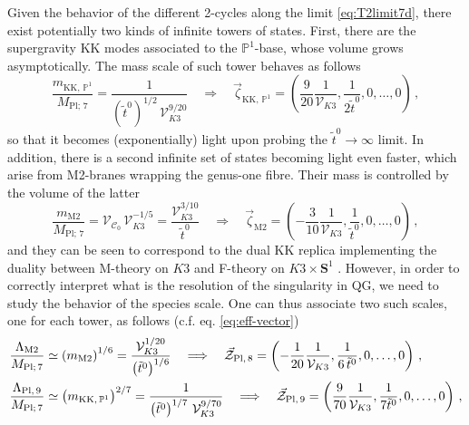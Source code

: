 Given the behavior of the different 2-cycles along the limit \eqref{eq:T2limit7d}, there exist potentially two kinds of infinite towers of states. First, there are the supergravity KK modes associated to the $\mathbb{P}^1$-base, whose volume grows asymptotically. The mass scale of such tower behaves as follows
%
\begin{equation}\label{eq:massP1}
	\frac{m_{\text{KK},\, \mathbb{P}^1}}{M_{\text{Pl};\, 7}}=\frac{1}{\left(\tilde{t}^0\right)^{1/2}\, \mathcal{V}_{K3}^{9/20}} \quad \Longrightarrow \quad \vec{\zeta}_{\text{KK},\, \mathbb{P}^1} = \left(\frac{9}{20} \frac{1}{\mathcal{V}_{K3}}, \frac{1}{2 \tilde{t}^0}, 0, \ldots, 0 \right)\, ,
\end{equation}
% 
so that it becomes (exponentially) light upon probing the $\tilde{t}^0 \to \infty$ limit. In addition, there is a second infinite set of states becoming light even faster, which arise from M2-branes wrapping the genus-one fibre. Their mass is controlled by the volume of the latter
%
\begin{equation}\label{eq:M2massFthy}
	\frac{m_{\text{M2}}}{M_{\text{Pl};\, 7}} = \mathcal{V}_{\mathcal{C}_0}\, \mathcal{V}_{K3}^{-1/5}=\frac{\mathcal{V}_{K3}^{3/10}}{\tilde{t}^0} \quad \Longrightarrow \quad \vec{\zeta}_{\text{M2}} = \left( -\frac{3}{10} \frac{1}{\mathcal{V}_{K3}}, \frac{1}{\tilde{t}^0}, 0, \ldots, 0 \right)\, ,
\end{equation}
%    
and they can be seen to correspond to the dual KK replica implementing the duality between M-theory on $K3$ and F-theory on $K3\times \mathbf{S}^1$ \cite{Vafa:1996xn,Lee:2019xtm}. However, in order to correctly interpret what is the resolution of the singularity in QG, we need to study the behavior of the species scale. One can thus associate two such scales, one for each tower, as follows (c.f. eq. \eqref{eq:eff-vector})
%
\begin{align}\label{eq:species7d}
	\notag \frac{\Lambda_{\rm M2}}{M_{\text{Pl};\, 7}} &\simeq \left(m_{\text{M2}}\right)^{1/6} = \frac{\mathcal{V}_{K3}^{1/20}}{\left( \tilde{t}^0\right)^{1/6}}\quad \Longrightarrow \quad \vec{\mathcal{Z}}_{\text{Pl},\, 8} = \left( -\frac{1}{20} \frac{1}{\mathcal{V}_{K3}}, \frac{1}{6\, \tilde{t}^0}, 0,\ldots, 0 \right)\, ,\\
	\frac{\Lambda_{\text{Pl},\, 9}}{M_{\text{Pl};\, 7}} &\simeq \left(m_{\text{KK},\, \mathbb{P}^1}\right)^{2/7} = \frac{1}{\left(\tilde{t}^0\right)^{1/7}\, \mathcal{V}_{K3}^{9/70}} \quad \Longrightarrow \quad \vec{\mathcal{Z}}_{\text{Pl},\, 9} = \left(\frac{9}{70} \frac{1}{\mathcal{V}_{K3}}, \frac{1}{7 \tilde{t}^0}, 0, \ldots, 0 \right)\, , 
\end{align}

